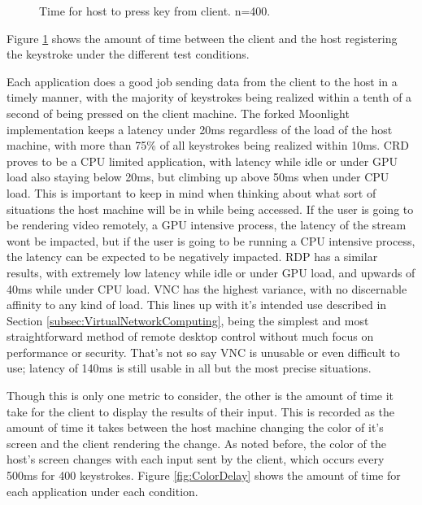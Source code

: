 \begin{figure}[h]
  \caption[Input Delay Data]{Time for host to press key from client. n=400.}
  \label{fig:InputDelay}
\end{figure}
Figure \ref{fig:InputDelay} shows the amount of time between the client and the host registering the keystroke under the different test conditions.

Each application does a good job sending data from the client to the host in a timely manner, with the majority of keystrokes being realized within a tenth of a second of being pressed on the client machine.
The forked Moonlight implementation keeps a latency under 20ms regardless of the load of the host machine, with more than 75\% of all keystrokes being realized within 10ms.
CRD proves to be a CPU limited application, with latency while idle or under GPU load also staying below 20ms, but climbing up above 50ms when under CPU load.
This is important to keep in mind when thinking about what sort of situations the host machine will be in while being accessed.
If the user is going to be rendering video remotely, a GPU intensive process, the latency of the stream wont be impacted, but if the user is going to be running a CPU intensive process, the latency can be expected to be negatively impacted.
RDP has a similar results, with extremely low latency while idle or under GPU load, and upwards of 40ms while under CPU load.
VNC has the highest variance, with no discernable affinity to any kind of load.
This lines up with it's intended use described in Section \ref{subsec:VirtualNetworkComputing}, being the simplest and most straightforward method of remote desktop control without much focus on performance or security.
That's not so say VNC is unusable or even difficult to use; latency of 140ms is still usable in all but the most precise situations.

Though this is only one metric to consider, the other is the amount of time it take for the client to display the results of their input.
This is recorded as the amount of time it takes between the host machine changing the color of it's screen and the client rendering the change.
As noted before, the color of the host's screen changes with each input sent by the client, which occurs every 500ms for 400 keystrokes.
Figure \ref{fig:ColorDelay} shows the amount of time for each application under each condition.

